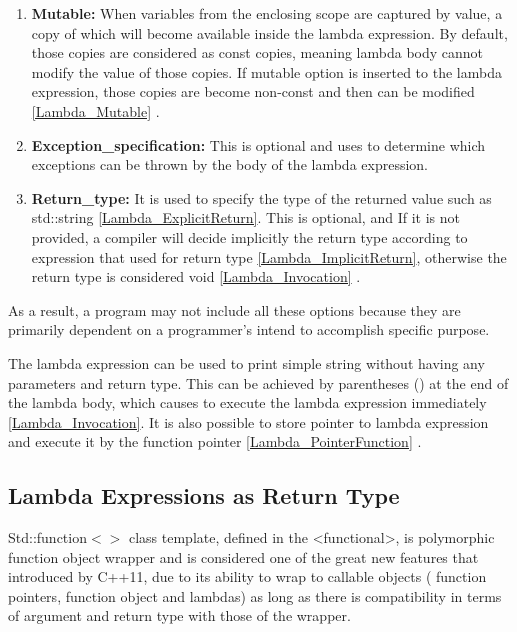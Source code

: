 \documentclass[11pt]{report}
\begin{document}
\begin{enumerate}
\item \textbf{Mutable:} When variables from the enclosing scope are captured by value, a copy of which will become available inside the lambda expression. By default, those copies are considered as const copies, meaning lambda body cannot modify the value of those copies. If mutable option is inserted to the lambda expression, those copies are become non-const and then can be modified \ref{Lambda_Mutable} \cite{Cppreference:2012:Cpp11}.

\item \textbf{Exception\_specification:} This is optional and uses to determine which exceptions can be thrown by the body of the lambda expression.

\item \textbf{Return\_type:} It is used to specify the type of the returned value such as std::string \ref{Lambda_ExplicitReturn}. This is optional, and If it is not provided, a compiler will decide implicitly the return type according to expression that used for return type \ref{Lambda_ImplicitReturn}, otherwise the return type is considered void \ref{Lambda_Invocation} \cite{Cppreference:2012:Cpp11}.
\end{enumerate}

As a result, a program may not include all these options because they are primarily dependent on a programmer's intend to accomplish specific purpose.
\newline

The lambda expression can be used to print simple string without having any parameters and return type. This can be achieved by parentheses () at the end of the lambda body, which causes to execute the lambda expression immediately \ref{Lambda_Invocation}. It is also possible to store pointer to lambda expression and execute it by the function pointer \ref{Lambda_PointerFunction} \cite{Gregorie:professionalcpp}.
\newline

\subsection{Lambda Expressions as Return Type}
\label{subsection: Lambda Expressions as Return Type}
Std::function$<>$ class template, defined in the <functional>, is polymorphic function object wrapper and is considered one of the great new features that introduced by C++11, due to its ability to wrap to callable objects ( function pointers, function object and lambdas) as long as there is compatibility in terms of argument  and return type with those of the wrapper.
\newline
\end{document}
